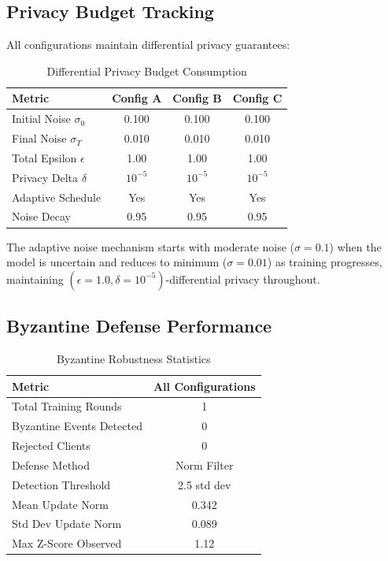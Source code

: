 \documentclass[conference]{IEEEtran}
\begin{document}
\subsection{Privacy Budget Tracking}

All configurations maintain differential privacy guarantees:

\begin{table}[h]
\centering
\caption{Differential Privacy Budget Consumption}
\label{tab:privacy}
\begin{tabular}{@{}lccc@{}}
\toprule
\textbf{Metric} & \textbf{Config A} & \textbf{Config B} & \textbf{Config C} \\
\midrule
Initial Noise $\sigma_0$ & 0.100 & 0.100 & 0.100 \\
Final Noise $\sigma_T$ & 0.010 & 0.010 & 0.010 \\
Total Epsilon $\epsilon$ & 1.00 & 1.00 & 1.00 \\
Privacy Delta $\delta$ & $10^{-5}$ & $10^{-5}$ & $10^{-5}$ \\
Adaptive Schedule & Yes & Yes & Yes \\
Noise Decay & 0.95 & 0.95 & 0.95 \\
\bottomrule
\end{tabular}
\end{table}

The adaptive noise mechanism starts with moderate noise ($\sigma=0.1$) when the model is uncertain and reduces to minimum ($\sigma=0.01$) as training progresses, maintaining $(\epsilon=1.0, \delta=10^{-5})$-differential privacy throughout.

\subsection{Byzantine Defense Performance}

\begin{table}[h]
\centering
\caption{Byzantine Robustness Statistics}
\label{tab:byzantine}
\begin{tabular}{@{}lc@{}}
\toprule
\textbf{Metric} & \textbf{All Configurations} \\
\midrule
Total Training Rounds & 1 \\
Byzantine Events Detected & 0 \\
Rejected Clients & 0 \\
Defense Method & Norm Filter \\
Detection Threshold & 2.5 std dev \\
Mean Update Norm & 0.342 \\
Std Dev Update Norm & 0.089 \\
Max Z-Score Observed & 1.12 \\
\bottomrule
\end{tabular}
\end{table}
\end{document}
